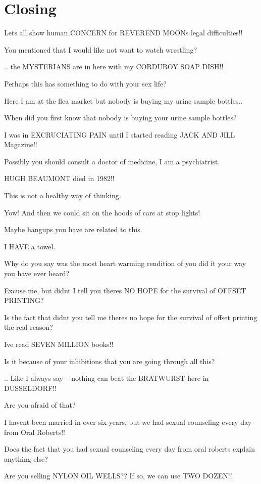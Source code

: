 \documentclass[cropmarks, frame, english]{idamasterthesis}
\begin{document}
\chapter{Closing}


Lets all show human CONCERN for REVEREND MOONs legal difficulties!!

You mentioned that I would like not want to watch wrestling?

..  the MYSTERIANS are in here with my CORDUROY SOAP DISH!!

Perhaps this has something to do with your sex life?

Here I am at the flea market but nobody is buying
 my urine sample bottles..

When did you first know that nobody is buying your urine sample
bottles?

I was in EXCRUCIATING PAIN until I started reading JACK AND JILL
 Magazine!!

Possibly you should consult a doctor of medicine, I am a psychiatrist.

HUGH BEAUMONT died in 1982!!

This is not a healthy way of thinking.

Yow!  And then we could sit on the hoods of cars at stop lights!

Maybe hangups you have are related to this.

I HAVE a towel.

Why do you say was the most heart warming rendition of you did it your
way you have ever heard?

Excuse me, but didnt I tell you theres NO HOPE for the
 survival of OFFSET PRINTING?

Is the fact that didnt you tell me theres no hope for the survival
of offset printing the real reason?

Ive read SEVEN MILLION books!!

Is it because of your inhibitions that you are going through all this?

..  Like I always say -- nothing can beat the BRATWURST
 here in DUSSELDORF!!

Are you afraid of that?

I havent been married in over six years, but we had sexual counseling
 every day from Oral Roberts!!

Does the fact that you had sexual counseling every day from oral
roberts explain anything else?

Are you selling NYLON OIL WELLS??  If so, we can use TWO DOZEN!!
\end{document}
